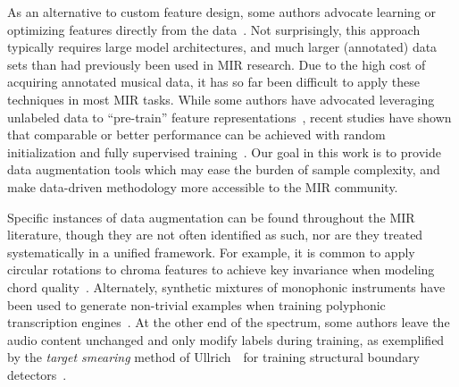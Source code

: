 \documentclass{article}
\begin{document}
%
%
%
As an alternative to custom feature design, some authors advocate learning or optimizing
features directly from the data~\cite{humphrey2012moving}.
Not surprisingly, this approach typically requires large model architectures, and
much larger (annotated) data sets than had previously been used in MIR research.  
Due to the high cost of acquiring annotated musical data, it has so far been difficult to
apply these techniques in most MIR tasks.
While some authors have advocated leveraging unlabeled data to ``pre-train'' feature
representations~\cite{dieleman2011audio}, 
recent studies have shown that comparable or better performance can be
achieved with random initialization and fully supervised training~\cite{glorot2011deep,zeiler2013rectified}.
Our goal in this work is to provide data augmentation tools which may ease the burden of 
sample complexity, and make data-driven methodology more accessible to the MIR community.

%
Specific instances of data augmentation can be found throughout the MIR literature,
though they are not often identified as such, nor are they treated systematically 
in a unified framework.
For example, it is common to apply circular rotations to chroma features
to achieve key invariance when modeling chord quality~\cite{lee2008acoustic}.
Alternately, synthetic mixtures of monophonic instruments have been used
to generate non-trivial examples when training polyphonic transcription
engines~\cite{kirchhoff2012multi}.
At the other end of the spectrum, some authors leave the audio content unchanged and
only modify labels during training, as exemplified by the \emph{target smearing}
method of Ullrich~\etal\ for training structural boundary
detectors~\cite{ullrich2014boundary}.
\end{document}
